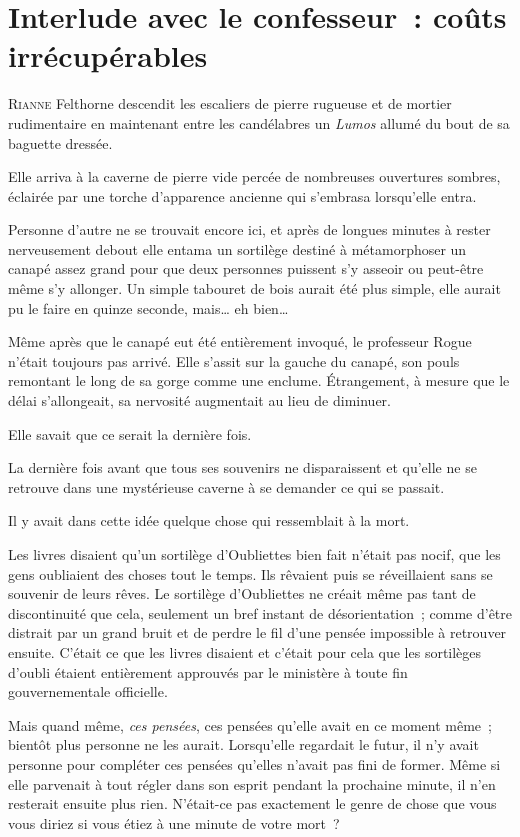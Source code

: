 \chapter{Interlude avec le confesseur~: coûts irrécupérables}

\lettrine{R}{ianne} Felthorne descendit les escaliers de pierre rugueuse et de mortier rudimentaire en maintenant entre les candélabres un \emph{Lumos} allumé du bout de sa baguette dressée.

Elle arriva à la caverne de pierre vide percée de nombreuses ouvertures sombres, éclairée par une torche d'apparence ancienne qui s'embrasa lorsqu'elle entra.

Personne d'autre ne se trouvait encore ici, et après de longues minutes à rester nerveusement debout elle entama un sortilège destiné à métamorphoser un canapé assez grand pour que deux personnes puissent s'y asseoir ou peut-être même s'y allonger. Un simple tabouret de bois aurait été plus simple, elle aurait pu le faire en quinze seconde, mais… eh bien…

Même après que le canapé eut été entièrement invoqué, le professeur Rogue n'était toujours pas arrivé. Elle s'assit sur la gauche du canapé, son pouls remontant le long de sa gorge comme une enclume. Étrangement, à mesure que le délai s'allongeait, sa nervosité augmentait au lieu de diminuer.

Elle savait que ce serait la dernière fois.

La dernière fois avant que tous ses souvenirs ne disparaissent et qu'elle ne se retrouve dans une mystérieuse caverne à se demander ce qui se passait.

Il y avait dans cette idée quelque chose qui ressemblait à la mort.

Les livres disaient qu'un sortilège d'Oubliettes bien fait n'était pas nocif, que les gens oubliaient des choses tout le temps. Ils rêvaient puis se réveillaient sans se souvenir de leurs rêves. Le sortilège d'Oubliettes ne créait même pas tant de discontinuité que cela, seulement un bref instant de désorientation~; comme d'être distrait par un grand bruit et de perdre le fil d'une pensée impossible à retrouver ensuite. C'était ce que les livres disaient et c'était pour cela que les sortilèges d'oubli étaient entièrement approuvés par le ministère à toute fin gouvernementale officielle.

Mais quand même, \emph{ces pensées}, ces pensées qu'elle avait en ce moment même~; bientôt plus personne ne les aurait. Lorsqu'elle regardait le futur, il n'y avait personne pour compléter ces pensées qu'elles n'avait pas fini de former. Même si elle parvenait à tout régler dans son esprit pendant la prochaine minute, il n'en resterait ensuite plus rien. N'était-ce pas exactement le genre de chose que vous vous diriez si vous étiez à une minute de votre mort~?

